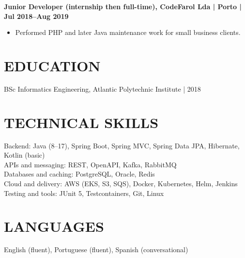 \documentclass[11pt,a4paper]{article}
\newcommand{\cvsection}[1]{\section*{#1}}
\begin{document}
\textbf{Junior Developer (internship then full-time), CodeFarol Lda | Porto | Jul 2018–Aug 2019}
\begin{itemize}
\item Performed PHP and later Java maintenance work for small business clients.
\end{itemize}

\cvsection{EDUCATION}
BSc Informatics Engineering, Atlantic Polytechnic Institute | 2018

\cvsection{TECHNICAL SKILLS}
Backend: Java (8–17), Spring Boot, Spring MVC, Spring Data JPA, Hibernate, Kotlin (basic)\\
APIs and messaging: REST, OpenAPI, Kafka, RabbitMQ\\
Databases and caching: PostgreSQL, Oracle, Redis\\
Cloud and delivery: AWS (EKS, S3, SQS), Docker, Kubernetes, Helm, Jenkins\\
Testing and tools: JUnit 5, Testcontainers, Git, Linux

\cvsection{LANGUAGES}
English (fluent), Portuguese (fluent), Spanish (conversational)
\end{document}
